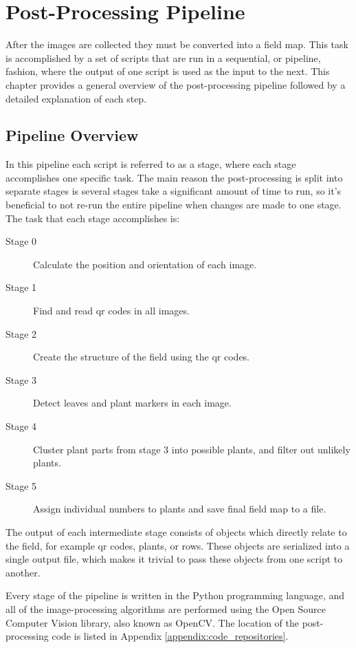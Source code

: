 
\cleardoublepage

\chapter{Post-Processing Pipeline}
\label{chapter:pipeline}

After the images are collected they must be converted into a field map. This task is accomplished by a set of scripts that are run in a sequential, or pipeline, fashion, where the output of one script is used as the input to the next.  This chapter provides a general overview of the post-processing pipeline followed by a detailed explanation of each step.

\section{Pipeline Overview}
\label{processing-overview}

In this pipeline each script is referred to as a stage, where each stage accomplishes one specific task.  The main reason the post-processing is split into separate stages is several stages take a significant amount of time to run, so it's beneficial to not re-run the entire pipeline when changes are made to one stage.  The task that each stage accomplishes is:

\begin{description}
\item[Stage 0] Calculate the position and orientation of each image.
\item[Stage 1] Find and read \ac{qr} codes in all images.
\item[Stage 2] Create the structure of the field using the \ac{qr} codes.
\item[Stage 3] Detect leaves and plant markers in each image.
\item[Stage 4] Cluster plant parts from stage 3 into possible plants, and filter out unlikely plants.
\item[Stage 5] Assign individual numbers to plants and save final field map to a file. 
\end{description}
 
The output of each intermediate stage consists of objects which directly relate to the field, for example \ac{qr} codes, plants, or rows.  These objects are serialized into a single output file, which makes it trivial to pass these objects from one script to another. 

Every stage of the pipeline is written in the Python programming language, and all of the image-processing algorithms are performed using the Open Source Computer Vision library, also known as OpenCV.  The location of the post-processing code is listed in Appendix \ref{appendix:code_repositories}.

